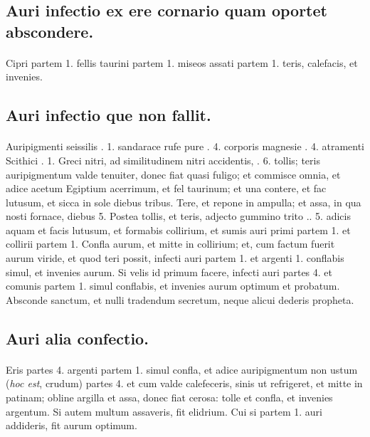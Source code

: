 \documentclass[a4paper, 11pt, oneside, polutonikogreek, italian]{article}
\begin{document}
\subsection{Auri infectio ex ere cornario quam oportet abscondere.}
\paragraph{}
Cipri partem 1. fellis taurini partem 1. miseos assati partem 1. teris, calefacis, et invenies.

\subsection{Auri infectio que non fallit.}
\paragraph{}
Auripigmenti seissilis \roundz. 1. sandarace rufe pure \roundz. 4. corporis magnesie \roundz. 4. atramenti Scithici \roundz. 1. Greci nitri, ad similitudinem nitri accidentis, \roundz. 6. tollis; teris auripigmentum valde tenuiter, donec fiat quasi fuligo; et commisce omnia, et adice acetum Egiptium acerrimum, et fel taurinum; et una contere, et fac lutusum, et sicca in sole diebus tribus. Tere, et repone in ampulla; et assa, in qua nosti fornace, diebus 5. Postea tollis, et teris, adjecto gummino trito .\roundz. 5. adicis aquam et facis lutusum, et formabis collirium, et sumis auri primi partem 1. et collirii partem 1. Confla aurum, et mitte in collirium; et, cum factum fuerit aurum viride, et quod teri possit, infecti auri partem 1. et argenti 1. conflabis simul, et invenies aurum. Si velis id primum facere, infecti auri partes 4. et comunis partem 1. simul conflabis, et invenies aurum optimum et probatum. Absconde sanctum, et nulli tradendum secretum, neque alicui dederis propheta.

\subsection{Auri alia confectio.}
\paragraph{}
Eris partes 4. argenti partem 1. simul confla, et adice auripigmentum non ustum (\emph{hoc est}, crudum) partes 4. et cum valde calefeceris, sinis ut refrigeret, et mitte in patinam; obline argilla et assa, donec fiat cerosa: tolle et confla, et invenies argentum. Si autem multum assaveris, fit elidrium. Cui si partem 1. auri addideris, fit aurum optimum.
\end{document}
